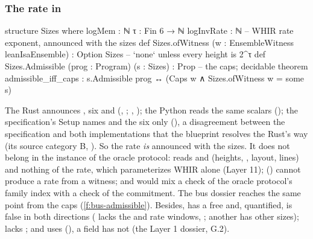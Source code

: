 \subsubsection{The rate in \texorpdfstring{\protect{}}{Sizes}}\label{sec:gen-boundary-st-rate}

\begin{leancode}
structure Sizes where
  logMem : ℕ
  τ : Fin 6 → ℕ
  logInvRate : ℕ                                   -- WHIR rate exponent, announced with the sizes
def Sizes.ofWitness (w : EnsembleWitness leanIsaEnsemble) : Option Sizes   -- `none` unless every height is 2^τ
def Sizes.Admissible (prog : Program) (s : Sizes) : Prop      -- the caps; decidable
theorem admissible_iff_caps : s.Admissible prog ↔ (Caps w ∧ Sizes.ofWitness w = some s)
\end{leancode}

The Rust announces , six  and  (,
; , ); the Python reads the same
 scalars (); the specification's Setup
names  and the six  only
(), a disagreement between the specification
and both implementations that the blueprint resolves the Rust's way (its source category B,
). So the rate \emph{is} announced with the sizes. It does not belong in the instance
of the oracle protocol:  reads  and  (heights,
, layout, lines) and nothing of the rate, which parameterizes WHIR alone (Layer 11);
 () cannot produce a rate from a witness; and
 would mix a check of the oracle protocol's family index with a check of
the commitment. The bus dossier reaches the same point from the caps
(\cref{f:bus-admissible}). Besides,  has a free  and, quantified,
is false in both directions ( lacks the  and rate windows,
; another  has other sizes);  lacks
; and  uses  (), a field
 has not (the Layer 1 dossier,  G.2).

